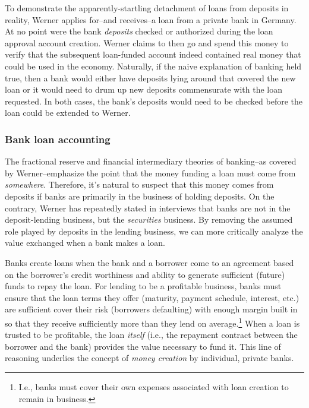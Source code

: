 To demonstrate the apparently-startling detachment of loans from deposits in reality, Werner applies for--and receives--a loan from a private bank in Germany.  At no point were the bank {\it deposits} checked or authorized during the loan approval account creation.  Werner claims to then go and spend this money to verify that the subsequent loan-funded account indeed contained real money that could be used in the economy.  Naturally, if the naive explanation of banking held true, then a bank would either have deposits lying around that covered the new loan or it would need to drum up new deposits commensurate with the loan requested.  In both cases, the bank's deposits would need to be checked before the loan could be extended to Werner.


\subsubsection{Bank loan accounting}

The fractional reserve and financial intermediary theories of banking--as covered by Werner--emphasize the point that the money funding a loan must come from {\it somewhere}.  Therefore, it's natural to suspect that this money comes from deposits if banks are primarily in the business of holding deposits.  On the contrary, Werner has repeatedly stated in interviews  that banks are not in the deposit-lending business, but the {\it securities} business.  By removing the assumed role played by deposits in the lending business, we can more critically analyze the value exchanged when a bank makes a loan.  

Banks create loans when the bank and a borrower come to an agreement based on the borrower's credit worthiness and ability to generate sufficient (future) funds to repay the loan.  For lending to be a profitable business, banks must ensure that the loan terms they offer (maturity, payment schedule, interest, etc.) are sufficient cover their risk (borrowers defaulting) with enough margin built in so that they receive sufficiently more than they lend on average.\footnote{I.e., banks must cover their own expenses associated with loan creation to remain in business.}  When a loan is trusted to be profitable, the loan {\it itself} (i.e., the repayment contract between the borrower and the bank) provides the value necessary to fund it.  This line of reasoning underlies the concept of {\it money creation} by individual, private banks.  

